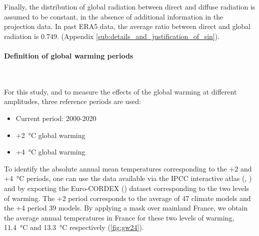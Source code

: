 \documentclass[11pt]{article}
\begin{document}
        Finally, the distribution of global radiation between direct and diffuse radiation is assumed to be constant, in the absence of additional information in the projection data. In past ERA5 data, the average ratio between direct and global radiation is \num{0.749}. (Appendix \ref{sub:details_and_justification_of_sin}). 

        \paragraph{Definition of global warming periods}\mbox{}\\ %
        \label{par:gw_periods}

        For this study, and to measure the effects of the global warming at different amplitudes, three reference periods are used:
        \begin{itemize}
            \item Current period: 2000-2020
            \item +\SI{2}{\celsius} global warming
            \item +\SI{4}{\celsius} global warming
        \end{itemize}
        To identify the absolute annual mean temperatures corresponding to the +2 and +\SI{4}{\celsius} periods, one can use the data available via the IPCC interactive atlas (\cite{ipcc_climate_2021}, \cite{iturbide_implementation_2022}) and by exporting the Euro-CORDEX (\cite{jacob_euro-cordex_2014}) dataset corresponding to the two levels of warming. The +2 period corresponds to the average of 47 climate models and the +4 period 39 models. By applying a mask over mainland France, we obtain the average annual temperatures in France for these two levels of warming, \SI{11.4}{\celsius} and \SI{13.3}{\celsius} respectively (\ref{fig:gw24}).\\
\end{document}
